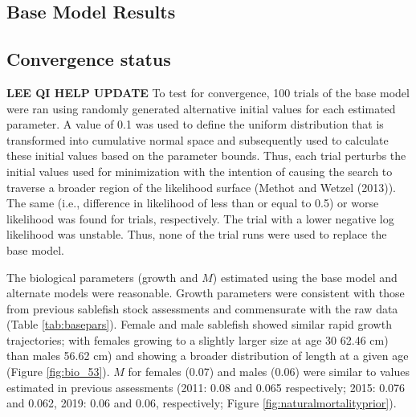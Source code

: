 \documentclass[11pt,
  english,
  a4paper,
]{article}
\begin{document}

\hypertarget{base-model-results}{%
\subsection{Base Model Results}\label{base-model-results}}

\leavevmode\tagmcend\tagstructend


\hypertarget{convergence-status}{%
\subsection{Convergence status}\label{convergence-status}}

\leavevmode\tagmcend\tagstructend


\textbf{LEE QI HELP UPDATE} To test for convergence, 100 trials of the base model were ran using randomly generated alternative initial values for each estimated parameter. A value of 0.1 was used to define the uniform distribution that is transformed into cumulative normal space and subsequently used to calculate these initial values based on the parameter bounds. Thus, each trial perturbs the initial values used for minimization with the intention of causing the search to traverse a broader region of the likelihood surface ({Methot and Wetzel (2013)\leavevmode\tagmcend\tagstructend}). The same (i.e., difference in likelihood of less than or equal to 0.5) or worse likelihood was found for trials, respectively. The trial with a lower negative log likelihood was unstable. Thus, none of the trial runs were used to replace the base model.

\leavevmode\tagmcend\tagstructend\par


The biological parameters (growth and {\(M\)\leavevmode\tagmcend\tagstructend}) estimated using the base model and alternate models were reasonable. Growth parameters were consistent with those from previous sablefish stock assessments and commensurate with the raw data (Table \ref{tab:basepars}). Female and male sablefish showed similar rapid growth trajectories; with females growing to a slightly larger size at age 30 62.46 cm) than males 56.62 cm) and showing a broader distribution of length at a given age (Figure \ref{fig:bio_53}). {\(M\)\leavevmode\tagmcend\tagstructend} for females (0.07) and males (0.06) were similar to values estimated in previous assessments (2011: 0.08 and 0.065 respectively; 2015: 0.076 and 0.062, 2019: 0.06 and 0.06, respectively; Figure \ref{fig:naturalmortalityprior}).
\end{document}
